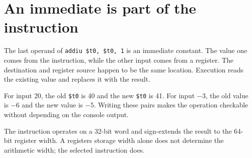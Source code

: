 \section{An immediate is part of the
  instruction}\label{001-console-calculation-p10-an-immediate-is-part-of-the-instruction}

The last operand of \texttt{addiu\ \$t0,\ \$t0,\ 1} is an immediate
constant. The value one comes from the instruction, while the other
input comes from a register. The destination and register source happen
to be the same location. Execution reads the existing value and replaces
it with the result.

For input 20, the old \texttt{\$t0} is 40 and the new \texttt{\$t0} is
41. For input \ensuremath{-}3, the old value is \ensuremath{-}6 and the new value is \ensuremath{-}5. Writing
these pairs makes the operation checkable without depending on the
console output.

The instruction operates on a 32-bit word and sign-extends the result to
the 64-bit register width. A register\textquotesingle s storage width
alone does not determine the arithmetic width; the selected instruction
does.
